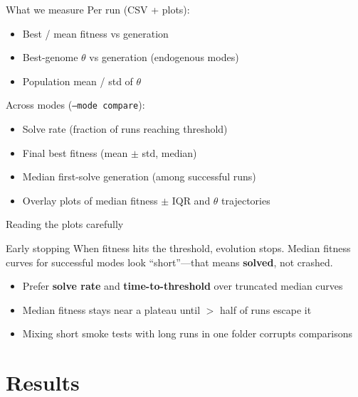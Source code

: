 \documentclass[aspectratio=169,11pt]{beamer}
\begin{document}
\begin{frame}{What we measure}
  Per run (CSV + plots):
  \begin{itemize}
    \item Best / mean fitness vs generation
    \item Best-genome $\theta$ vs generation (endogenous modes)
    \item Population mean / std of $\theta$
  \end{itemize}

  \vspace{0.5em}
  Across modes (\texttt{--mode compare}):
  \begin{itemize}
    \item Solve rate (fraction of runs reaching threshold)
    \item Final best fitness (mean $\pm$ std, median)
    \item Median first-solve generation (among successful runs)
    \item Overlay plots of median fitness $\pm$ IQR and $\theta$ trajectories
  \end{itemize}
\end{frame}

\begin{frame}{Reading the plots carefully}
  \begin{alertblock}{Early stopping}
    When fitness hits the threshold, evolution stops.
    Median fitness curves for successful modes look ``short''---that means
    \textbf{solved}, not crashed.
  \end{alertblock}

  \begin{itemize}
    \item Prefer \textbf{solve rate} and \textbf{time-to-threshold} over truncated median curves
    \item Median fitness stays near a plateau until $>$ half of runs escape it
    \item Mixing short smoke tests with long runs in one folder corrupts comparisons
  \end{itemize}
\end{frame}

\section{Results}
\end{document}
